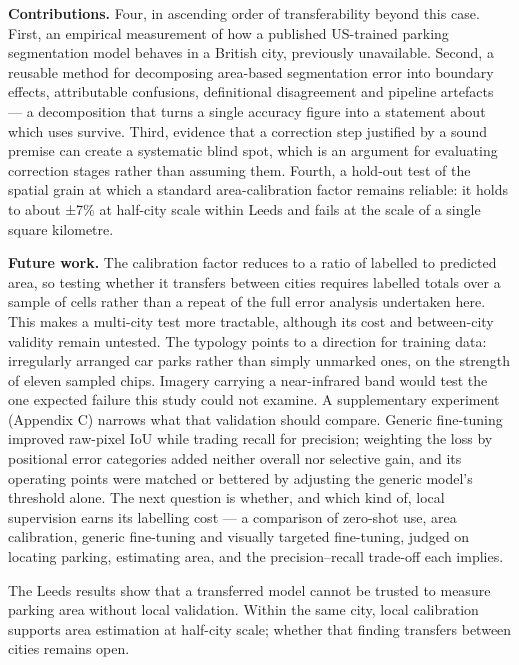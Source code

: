 \textbf{Contributions.} Four, in ascending order of transferability beyond this case. First, an empirical measurement of how a published US-trained parking segmentation model behaves in a British city, previously unavailable. Second, a reusable method for decomposing area-based segmentation error into boundary effects, attributable confusions, definitional disagreement and pipeline artefacts --- a decomposition that turns a single accuracy figure into a statement about which uses survive. Third, evidence that a correction step justified by a sound premise can create a systematic blind spot, which is an argument for evaluating correction stages rather than assuming them. Fourth, a hold-out test of the spatial grain at which a standard area-calibration factor remains reliable: it holds to about ±7\% at half-city scale within Leeds and fails at the scale of a single square kilometre.

\textbf{Future work.} The calibration factor reduces to a ratio of labelled to predicted area, so testing whether it transfers between cities requires labelled totals over a sample of cells rather than a repeat of the full error analysis undertaken here. This makes a multi-city test more tractable, although its cost and between-city validity remain untested. The typology points to a direction for training data: irregularly arranged car parks rather than simply unmarked ones, on the strength of eleven sampled chips. Imagery carrying a near-infrared band would test the one expected failure this study could not examine. A supplementary experiment (Appendix C) narrows what that validation should compare. Generic fine-tuning improved raw-pixel IoU while trading recall for precision; weighting the loss by positional error categories added neither overall nor selective gain, and its operating points were matched or bettered by adjusting the generic model's threshold alone. The next question
is whether, and which kind of, local supervision earns its labelling cost --- a comparison of zero-shot use, area calibration, generic fine-tuning and visually targeted fine-tuning, judged on locating parking, estimating area, and the precision--recall trade-off each implies.

The Leeds results show that a transferred model cannot be trusted to measure parking area without local validation. Within the same city, local calibration supports area estimation at half-city scale; whether that finding transfers between cities remains open.
